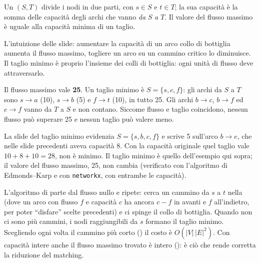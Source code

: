 \begin{teorema}
Un  $(S, T)$ divide i nodi in due parti, con $s \in S$ e $t \in T$; la sua
capacità è la somma delle capacità degli archi che vanno \emph{da} $S$ \emph{a} $T$. Il
valore del flusso massimo è uguale alla capacità minima di un taglio.
\end{teorema}

L'intuizione delle slide: aumentare la capacità di un arco collo di bottiglia aumenta il
flusso massimo, togliere un arco su un cammino critico lo diminuisce. Il taglio minimo è
proprio l'insieme dei colli di bottiglia: ogni unità di flusso deve attraversarlo.

\begin{esempio}
Il flusso massimo vale \textbf{25}. Un taglio minimo è $S = \{s, c, f\}$: gli archi da $S$
a $T$ sono $s \to a$ (10), $s \to b$ (5) e $f \to t$ (10), in tutto 25. Gli archi
$b \to c$, $b \to f$ ed $e \to f$ vanno da $T$ a $S$ e non contano. Siccome flusso e taglio coincidono,
nessun flusso può superare 25 e nessun taglio può valere meno.
\end{esempio}

\begin{attenzione}
La slide del taglio minimo evidenzia $S = \{s, b, c, f\}$ e scrive 5 sull'arco $b \to e$,
che nelle slide precedenti aveva capacità 8. Con la capacità originale quel taglio vale
$10 + 8 + 10 = 28$, non è minimo. Il taglio minimo è quello dell'esempio qui sopra; il
valore del flusso massimo, 25, non cambia (verificato con l'algoritmo di Edmonds--Karp e
con \texttt{networkx}, con entrambe le capacità).
\end{attenzione}

\begin{extra}
L'algoritmo di  parte dal flusso nullo e ripete: cerca un cammino da
$s$ a $t$ nella  (dove un arco con flusso $f$ e capacità $c$ ha ancora
$c - f$ in avanti e $f$ all'indietro, per poter ``disfare'' scelte precedenti) e ci spinge
il collo di bottiglia. Quando non ci sono più cammini, i nodi raggiungibili da $s$ formano
il taglio minimo. Scegliendo ogni volta il cammino più corto () il costo
è $O(|V|\,|E|^2)$. Con capacità intere anche il flusso massimo trovato è intero
(): è ciò che rende corretta la riduzione del matching.
\end{extra}

